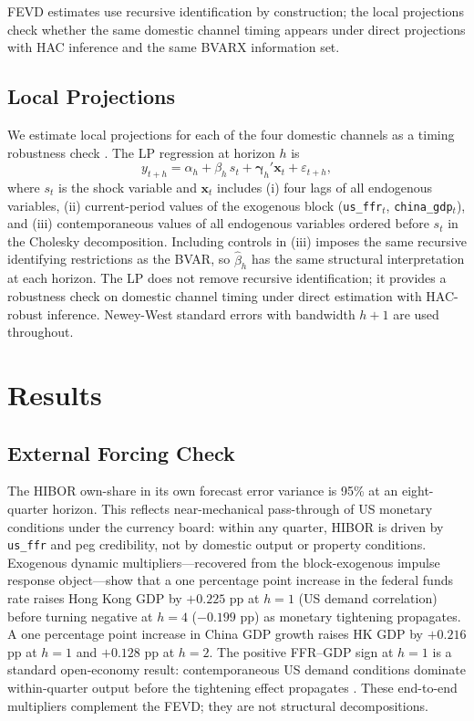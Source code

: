 \documentclass[12pt,a4paper]{article}
\begin{document}
FEVD estimates use recursive identification by construction; the local projections
check whether the same domestic channel timing appears under direct projections
with HAC inference and the same BVARX information set.

\subsection{Local Projections}
\label{sec:lp_method}

We estimate local projections \citep{Jorda2005} for each of the four domestic
channels as a timing robustness check \citep{RameyZubairy2018}. The LP regression
at horizon $h$ is
\begin{equation}
  y_{t+h} = \alpha_h + \beta_h\, s_t
            + \boldsymbol{\gamma}_h' \mathbf{x}_t
            + \varepsilon_{t+h},
\label{eq:lp}
\end{equation}
where $s_t$ is the shock variable and $\mathbf{x}_t$ includes (i) four lags of
all endogenous variables, (ii) current-period values of the exogenous block
(\texttt{us\_ffr}$_t$, \texttt{china\_gdp}$_t$), and (iii) contemporaneous values
of all endogenous variables ordered before $s_t$ in the Cholesky decomposition.
Including controls in (iii) imposes the same recursive identifying restrictions
as the BVAR, so $\hat{\beta}_h$ has the same structural interpretation at each
horizon. The LP does not remove recursive identification; it provides a robustness
check on domestic channel timing under direct estimation with HAC-robust inference.
Newey-West standard errors with bandwidth $h + 1$ are used throughout.

\section{Results}
\label{sec:results}

\subsection{External Forcing Check}

The HIBOR own-share in its own forecast error variance is 95\% at an eight-quarter
horizon. This reflects near-mechanical pass-through of US monetary conditions
under the currency board: within any quarter, HIBOR is driven by \texttt{us\_ffr}
and peg credibility, not by domestic output or property conditions. Exogenous
dynamic multipliers---recovered from the block-exogenous impulse response
object---show that a one percentage point increase in the federal funds rate raises
Hong Kong GDP by $+0.225$ pp at $h = 1$ (US demand correlation) before turning
negative at $h = 4$ ($-0.199$ pp) as monetary tightening propagates. A one
percentage point increase in China GDP growth raises HK GDP by $+0.216$ pp at
$h = 1$ and $+0.128$ pp at $h = 2$. The positive FFR--GDP sign at $h = 1$ is a
standard open-economy result: contemporaneous US demand conditions dominate
within-quarter output before the tightening effect propagates \citep{CushmanZha1997}.
These end-to-end multipliers complement the FEVD; they are not structural
decompositions.
\end{document}
